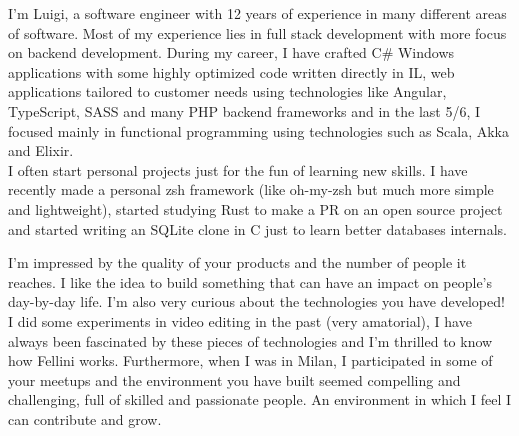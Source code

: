 \documentclass{resume} %
\begin{document}

\makelettertitle


\begin{cvletter}

I'm Luigi, a software engineer with 12 years of experience in many different areas of software. Most of my experience lies in full stack development with more focus on backend development. During my
career, I have crafted C\# Windows applications with some highly optimized code written directly in IL, web applications tailored to customer needs using technologies like Angular, TypeScript, SASS and
many PHP backend frameworks and in the last 5/6, I focused mainly in functional programming using technologies such as Scala, Akka and Elixir. \\ I often start personal projects just for the fun of
learning new skills.  I have recently made a personal zsh framework (like oh-my-zsh but much more simple and lightweight), started studying Rust to make a PR on an open source project and started writing
an SQLite clone in C just to learn better databases internals.

I'm impressed by the quality of your products and the number of people it reaches. I like the idea to build something that can have an impact on people's day-by-day life. I'm also very curious about the technologies
you have developed! I did some experiments in video editing in the past (very amatorial), I have always been fascinated by these pieces of technologies and I'm thrilled to know how Fellini works. Furthermore, when I 
was in Milan, I participated in some of your meetups and the environment you have built seemed compelling and challenging, full of skilled and passionate people. An environment in which I feel I can contribute
and grow.

\end{cvletter}


\makeletterclosing
\end{document}
